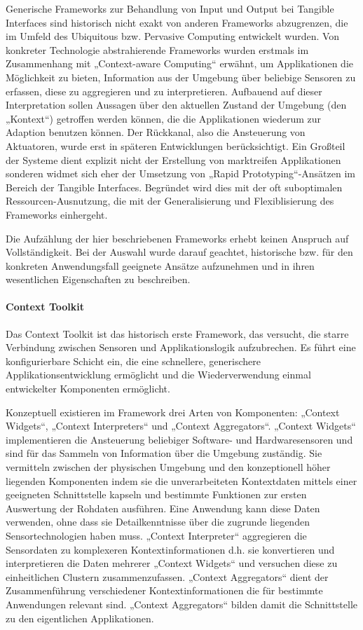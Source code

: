 Generische Frameworks zur Behandlung von Input und Output bei Tangible Interfaces sind historisch nicht exakt von anderen Frameworks abzugrenzen, die im Umfeld des Ubiquitous bzw. Pervasive Computing \citep{Weiser91} entwickelt wurden. Von konkreter Technologie abstrahierende Frameworks wurden erstmals im Zusammenhang mit „Context-aware Computing“ \citep{Schilit94} erwähnt, um Applikationen die Möglichkeit zu bieten, Information aus der Umgebung über beliebige Sensoren zu erfassen, diese zu aggregieren und zu interpretieren. Aufbauend auf dieser Interpretation sollen Aussagen über den aktuellen Zustand der Umgebung (den „Kontext“) getroffen werden können, die die Applikationen wiederum zur Adaption benutzen können. Der Rückkanal, also die Ansteuerung von Aktuatoren, wurde erst in späteren Entwicklungen berücksichtigt. Ein Großteil der Systeme dient explizit nicht der Erstellung von marktreifen Applikationen sonderen widmet sich eher der Umsetzung von „Rapid Prototyping“-Ansätzen im Bereich der Tangible Interfaces. Begründet wird dies mit der oft suboptimalen Ressourcen-Ausnutzung, die mit der Generalisierung und Flexiblisierung des Frameworks einhergeht. 

Die Aufzählung der hier beschriebenen Frameworks erhebt keinen Anspruch auf Vollständigkeit. Bei der Auswahl wurde darauf geachtet, historische bzw. für den konkreten Anwendungsfall geeignete Ansätze aufzunehmen und in ihren wesentlichen Eigenschaften zu beschreiben.

\paragraph{Context Toolkit} %
\label{par:context_toolkit}
 
Das Context Toolkit \citep{Dey01} ist das historisch erste Framework, das versucht, die starre Verbindung zwischen Sensoren und Applikationslogik aufzubrechen. Es führt eine konfigurierbare Schicht ein, die eine schnellere, generischere Applikationsentwicklung ermöglicht und die Wiederverwendung einmal entwickelter Komponenten ermöglicht.

Konzeptuell existieren im Framework drei Arten von Komponenten: „Context Widgets“, „Context Interpreters“ und „Context Aggregators“. „Context Widgets“ implementieren die Ansteuerung beliebiger Software- und Hardwaresensoren und sind für das Sammeln von Information über die Umgebung zuständig. Sie vermitteln zwischen der physischen Umgebung und den konzeptionell höher liegenden Komponenten indem sie die unverarbeiteten Kontextdaten mittels einer geeigneten Schnittstelle kapseln und bestimmte Funktionen zur ersten Auswertung der Rohdaten ausführen. Eine Anwendung kann diese Daten verwenden, ohne dass sie Detailkenntnisse über die zugrunde liegenden Sensortechnologien haben muss. „Context Interpreter“ aggregieren die Sensordaten zu komplexeren Kontextinformationen d.h. sie konvertieren und interpretieren die Daten mehrerer „Context Widgets“ und versuchen diese zu einheitlichen Clustern zusammenzufassen. „Context Aggregators“ dient der Zusammenführung verschiedener Kontextinformationen die für bestimmte Anwendungen relevant sind. „Context Aggregators“ bilden damit die Schnittstelle zu den eigentlichen Applikationen.


